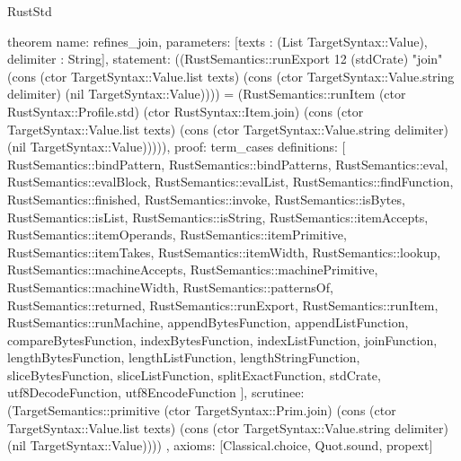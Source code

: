 \begin{lexlean}{RustStd}
\begin{semanticmodule}
theorem{
  name: refines_join,
  parameters: [texts : (List TargetSyntax::Value), delimiter : String],
  statement: ((RustSemantics::runExport 12 (stdCrate) "join" (cons (ctor TargetSyntax::Value.list texts) (cons (ctor TargetSyntax::Value.string delimiter) (nil TargetSyntax::Value)))) = (RustSemantics::runItem (ctor RustSyntax::Profile.std) (ctor RustSyntax::Item.join) (cons (ctor TargetSyntax::Value.list texts) (cons (ctor TargetSyntax::Value.string delimiter) (nil TargetSyntax::Value))))),
  proof: term_cases{
    definitions: [
      RustSemantics::bindPattern,
      RustSemantics::bindPatterns,
      RustSemantics::eval,
      RustSemantics::evalBlock,
      RustSemantics::evalList,
      RustSemantics::findFunction,
      RustSemantics::finished,
      RustSemantics::invoke,
      RustSemantics::isBytes,
      RustSemantics::isList,
      RustSemantics::isString,
      RustSemantics::itemAccepts,
      RustSemantics::itemOperands,
      RustSemantics::itemPrimitive,
      RustSemantics::itemTakes,
      RustSemantics::itemWidth,
      RustSemantics::lookup,
      RustSemantics::machineAccepts,
      RustSemantics::machinePrimitive,
      RustSemantics::machineWidth,
      RustSemantics::patternsOf,
      RustSemantics::returned,
      RustSemantics::runExport,
      RustSemantics::runItem,
      RustSemantics::runMachine,
      appendBytesFunction,
      appendListFunction,
      compareBytesFunction,
      indexBytesFunction,
      indexListFunction,
      joinFunction,
      lengthBytesFunction,
      lengthListFunction,
      lengthStringFunction,
      sliceBytesFunction,
      sliceListFunction,
      splitExactFunction,
      stdCrate,
      utf8DecodeFunction,
      utf8EncodeFunction
    ],
    scrutinee: (TargetSemantics::primitive (ctor TargetSyntax::Prim.join) (cons (ctor TargetSyntax::Value.list texts) (cons (ctor TargetSyntax::Value.string delimiter) (nil TargetSyntax::Value))))
  },
  axioms: [Classical.choice, Quot.sound, propext]
}
\end{semanticmodule}
\end{lexlean}
